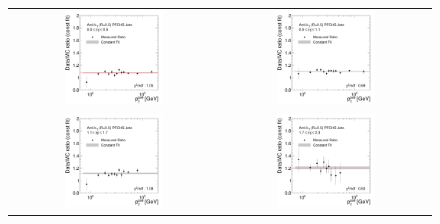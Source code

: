 \begin{figure}[!htp]
  \centering
  \begin{tabular}{cc}
                \includegraphics[width=0.49\textwidth]{figures/ExtrapolRatio_Eta0_with_pli_final_nominal_v4.pdf} &
                \includegraphics[width=0.49\textwidth]{figures/ExtrapolRatio_Eta1_with_pli_final_nominal_v4.pdf} \\
                \includegraphics[width=0.49\textwidth]{figures/ExtrapolRatio_Eta2_with_pli_final_nominal_v4.pdf} &
                \includegraphics[width=0.49\textwidth]{figures/ExtrapolRatio_Eta3_with_pli_final_nominal_v4.pdf} \\

\end{tabular}
\end{figure}
